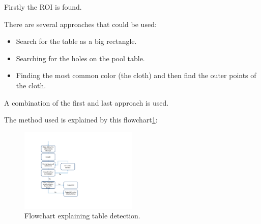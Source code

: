 Firstly the ROI is found. 

There are several approaches that could be used:
\begin{itemize}
	\item Search for the table as a big rectangle.
	\item Searching for the holes on the pool table.
	\item Finding the most common color (the cloth) and then find the outer points of the cloth.
\end{itemize}

A combination of the first and last approach is used.

The method used is explained by this flowchart\ref{fig:detecttable_flowchart}:

\begin{figure}[htpb]
\begin{center}
\leavevmode
\includegraphics[width=0.5\textwidth]{images/tabledetect_flowchat.pdf}
\end{center}
\caption{Flowchart explaining table detection.}
\label{fig:detecttable_flowchart}
\end{figure}

